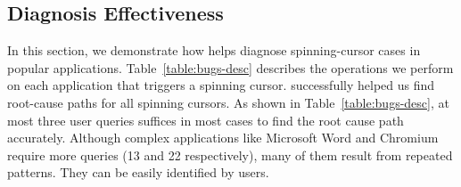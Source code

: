 \subsection{Diagnosis Effectiveness}\label{sec:casestudy}

In this section, we demonstrate how \xxx helps diagnose \nbug
spinning-cursor cases in popular applications. Table~\ref{table:bugs-desc}
describes the operations we perform on each application that triggers a
spinning cursor.  \xxx successfully helped us find root-cause paths for
all spinning cursors.  As shown in Table~\ref{table:bugs-desc}, at most
three user queries suffices in most cases to find the root cause path
accurately. Although complex applications like Microsoft Word and Chromium
require more queries (13 and 22 respectively), many of them result from
repeated patterns. They can be easily identified by users.









